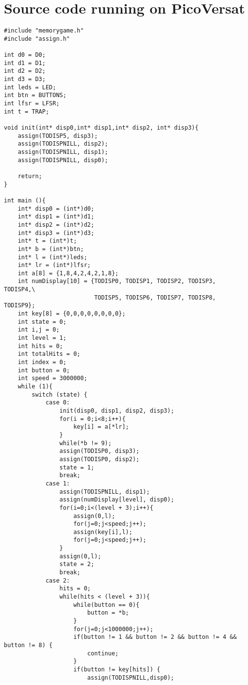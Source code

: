 \section{Source code running on PicoVersat}
\begin{lstlisting}[style=CStyle]
#include "memorygame.h"
#include "assign.h"

int d0 = D0;
int d1 = D1;
int d2 = D2;
int d3 = D3;
int leds = LED;
int btn = BUTTONS;
int lfsr = LFSR;
int t = TRAP;

void init(int* disp0,int* disp1,int* disp2, int* disp3){
    assign(TODISP5, disp3);
    assign(TODISPNILL, disp2);
    assign(TODISPNILL, disp1);
    assign(TODISPNILL, disp0);

    return;
}

int main (){
    int* disp0 = (int*)d0;
    int* disp1 = (int*)d1;
    int* disp2 = (int*)d2;
    int* disp3 = (int*)d3;
    int* t = (int*)t;
    int* b = (int*)btn;
    int* l = (int*)leds;
    int* lr = (int*)lfsr;
    int a[8] = {1,8,4,2,4,2,1,8};
    int numDisplay[10] = {TODISP0, TODISP1, TODISP2, TODISP3, TODISP4,\
                          TODISP5, TODISP6, TODISP7, TODISP8, TODISP9};
    int key[8] = {0,0,0,0,0,0,0,0};
    int state = 0;
    int i,j = 0;
    int level = 1;
    int hits = 0;
    int totalHits = 0;
    int index = 0;
    int button = 0;
    int speed = 3000000;
    while (1){
        switch (state) {
            case 0:
                init(disp0, disp1, disp2, disp3);
                for(i = 0;i<8;i++){
                    key[i] = a[*lr];
                }
                while(*b != 9);
                assign(TODISP0, disp3);
                assign(TODISP0, disp2);
                state = 1;
                break;
            case 1:
                assign(TODISPNILL, disp1);
                assign(numDisplay[level], disp0);
                for(i=0;i<(level + 3);i++){
                    assign(0,l);
                    for(j=0;j<speed;j++);
                    assign(key[i],l);
                    for(j=0;j<speed;j++);
                }
                assign(0,l);
                state = 2;
                break;
            case 2:
                hits = 0;
                while(hits < (level + 3)){
                    while(button == 0){
                        button = *b;
                    }
                    for(j=0;j<1000000;j++);
                    if(button != 1 && button != 2 && button != 4 && button != 8) {
                        continue;
                    }
                    if(button != key[hits]) {
                        assign(TODISPNILL,disp0);

\end{lstlisting}
